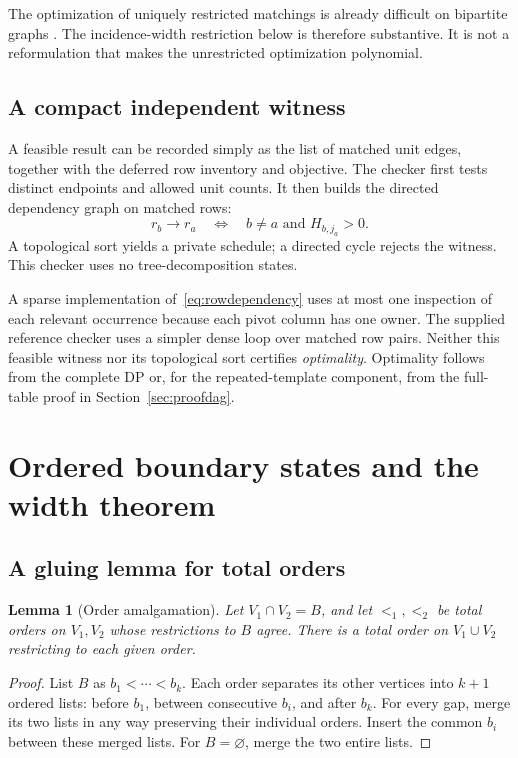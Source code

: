 \documentclass[11pt,a4paper]{article}
\newtheorem{lemma}[theorem]{Lemma}
\theoremstyle{definition}
\theoremstyle{remark}
\begin{document}
The optimization of uniquely restricted matchings is already difficult
on bipartite graphs \cite{golumbic2001}. The incidence-width restriction
below is therefore substantive. It is not a reformulation that makes the
unrestricted optimization polynomial.

\subsection{A compact independent witness}
A feasible result can be recorded simply as the list of matched unit
edges, together with the deferred row inventory and objective. The checker
first tests distinct endpoints and allowed unit counts. It then builds the
directed dependency graph on matched rows:
\begin{equation}
 r_b\longrightarrow r_a
 \quad\Longleftrightarrow\quad
 b\ne a\text{ and }H_{b,j_a}>0.
 \label{eq:rowdependency}
\end{equation}
A topological sort yields a private schedule; a directed cycle rejects the
witness. This checker uses no tree-decomposition states.

A sparse implementation of~\eqref{eq:rowdependency} uses at most one
inspection of each relevant occurrence because each pivot column has one
owner. The supplied reference checker uses a simpler dense loop over
matched row pairs. Neither this feasible witness nor its topological sort
certifies \emph{optimality}. Optimality follows from the complete DP or,
for the repeated-template component, from the full-table proof in
Section~\ref{sec:proofdag}.

\section{Ordered boundary states and the width theorem}
\label{sec:width}

\subsection{A gluing lemma for total orders}
\begin{lemma}[Order amalgamation]
\label{lem:amalgamation}
Let $V_1\cap V_2=B$, and let $<_1,<_2$ be total orders on $V_1,V_2$
whose restrictions to $B$ agree. There is a total order on $V_1\cup V_2$
restricting to each given order.
\end{lemma}
\begin{proof}
List $B$ as $b_1<\cdots<b_k$. Each order separates its other vertices
into $k+1$ ordered lists: before $b_1$, between consecutive $b_i$, and
after $b_k$. For every gap, merge its two lists in any way preserving their
individual orders. Insert the common $b_i$ between these merged lists.
For $B=\varnothing$, merge the two entire lists.
\end{proof}
\end{document}

